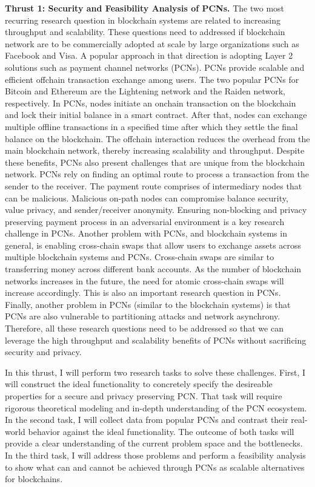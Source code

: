 \documentclass{NSF}
\newcommand{\BfPara}[1]{{\noindent\textbf{#1.}}\xspace}
\begin{document}
\BfPara{Thrust 1: Security and Feasibility Analysis of PCNs} The two most recurring research question in blockchain systems are related to increasing throughput and scalability. These questions need to addressed if blockchain network are to be commercially adopted at scale by large organizations such as Facebook and Visa. A popular approach in that direction is adopting Layer 2 solutions such as payment channel networks (PCNs). PCNs provide scalable and efficient offchain transaction exchange among users. The two popular PCNs for Bitcoin and Ethereum are the Lightening network and the Raiden network, respectively. In PCNs, nodes initiate an onchain transaction on the blockchain and lock their initial balance in a smart contract. After that, nodes can exchange multiple offline transactions in a specified time after which they settle the final balance on the blockchain. The offchain interaction reduces the overhead from the main blockchain network, thereby increasing scalability and throughput. Despite these benefits, PCNs also present challenges that are unique from the blockchain network. PCNs rely on finding an optimal route to process a transaction from the sender to the receiver. The payment route comprises of intermediary nodes that can be malicious. Malicious on-path nodes can compromise balance security, value privacy, and sender/receiver anonymity. Ensuring non-blocking and privacy preserving payment process in  an adversarial environment is a key research challenge in PCNs. Another problem with PCNs, and blockchain systems in general, is enabling cross-chain swaps that allow users to exchange assets across multiple blockchain systems and PCNs. Cross-chain swaps are similar to transferring money across different bank accounts. As the number of blockchain networks increases in the future, the need for atomic cross-chain swaps will increase accordingly. This is also an important research question in PCNs.  Finally, another problem in PCNs (similar to the blockchain systems) is that PCNs are also vulnerable to partitioning attacks and network asynchrony. Therefore, all these research questions need to be addressed so that we can leverage the high throughput and scalability benefits of PCNs without sacrificing security and privacy. 

In this thrust, I will perform two research tasks to solve these challenges. First, I will construct the ideal functionality to concretely specify the desireable properties for a secure and privacy preserving PCN. That task will require rigorous theoretical modeling and in-depth understanding of the PCN ecosystem. In the second task, I will collect data from popular PCNs and contrast their real-world behavior against the ideal functionality. The outcome of both tasks will provide a clear understanding of the current problem space and the bottlenecks. In the third task, I will address those problems and perform a feasibility analysis to show what can and cannot be achieved through PCNs as scalable alternatives for blockchains. 
\end{document}
